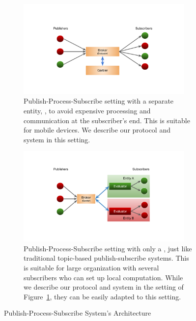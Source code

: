 \begin{figure}[h]
	\centering
	
		\begin{subfigure}{0.45\textwidth}
		\centering
		\includegraphics[width=0.95\textwidth]{figures/pps-out}

		\caption{Publish-Process-Subscribe setting with a separate entity,
		\garbler, to avoid expensive processing and communication at the
		subscriber's end. This is suitable for mobile devices. We describe our
		protocol and system in this setting.}

		\label{fig:pps-out}
	\end{subfigure}

	\begin{subfigure}{0.45\textwidth}
		\centering
		\includegraphics[width=0.95\textwidth]{figures/pps-local}

		\caption{Publish-Process-Subscribe setting with only a \broker, just like
		traditional topic-based publish-subscribe systems. This is suitable for
		large organization with several subscribers who can set up local
		computation. While we describe our protocol and system in the setting of
		Figure~\ref{fig:pps-out}, they can be easily adapted to this setting.}

		\label{fig:pps-local}
	\end{subfigure}


	\vspace{12pt}
	\caption{Publish-Process-Subscribe System's Architecture}
	\label{fig:pps}
\end{figure}

